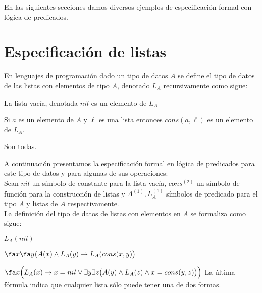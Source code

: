 \documentclass[11pt,letterpaper]{article}
\begin{document}
\begin{itemize}


\end{itemize}


En las siguientes secciones damos diversos ejemplos de especificación formal
con lógica de predicados.

\section{Especificación de listas}

En lenguajes de programación dado un tipo de datos $A$ se define el tipo de
datos de las listas con elementos de tipo $A$, denotado $L_A$ recursivamente
como sigue:
\be
\item La lista vacía, denotada $nil$ es un elemento de $L_A$
\item Si $a$ es un elemento de $A$ y $\ell$ es una lista entonces
  $cons(a,\ell)$ es un elemento de $L_A$.
\item Son todas.
\ee

A continuación presentamos la especificación formal en lógica de predicados 
para este tipo de datos y para algunas de sus operaciones: \\
Sean $nil$ un símbolo de constante para la lista vacía, $cons^{(2)}$ un
símbolo de función para la construcción de listas y $A^{(1)},L_A^{(1)}$  
símbolos de predicado para el tipo $A$ y listas de $A$ respectivamente.\\
La definición del tipo de datos de listas con elementos en $A$ se formaliza 
como sigue:
\bi
 \item $L_A(nil)$
 \item $\fa x\fa y\big(A(x)\land L_A(y)\to L_A(cons(x,y)\big)$
 \item $\fa x\Big(L_A(x)\to x=nil \lor \exists y\exists z\big(A(y) \land 
  L_A(z) \land x = cons(y,z)\big)\Big)$
\ei
La \'ultima f\'ormula indica que cualquier lista s\'olo puede tener una de dos 
formas.
  
\end{document}
